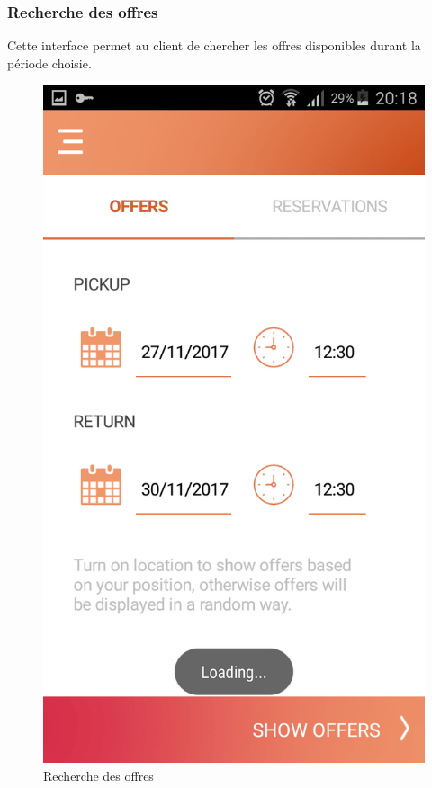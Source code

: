 \documentclass[12pt,a4paper]{report}
\begin{document}
	\subsubsection{Recherche des offres}
Cette interface permet au client de chercher les offres disponibles durant la période choisie.
	\vspace{2cm}
	\begin{figure}[!hbtp]
		\centering
		\includegraphics[scale=0.2]{./graphics/Date.png}
		\caption{Recherche des offres}
		\end{figure}
		\newpage
\end{document}
